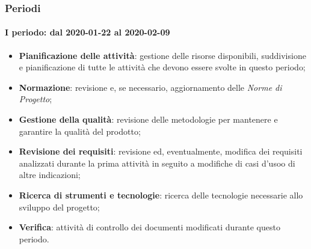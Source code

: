 \subsubsection{Periodi}
\paragraph*{I periodo: dal 2020-01-22 al 2020-02-09}
\begin{itemize}
	\item \textbf{Pianificazione delle attività}: gestione delle risorse disponibili, suddivisione e pianificazione di tutte le attività che devono essere svolte in questo periodo;
	\item \textbf{Normazione}: revisione e, se necessario, aggiornamento delle \textit{Norme di Progetto};
	\item \textbf{Gestione della qualità}: revisione delle metodologie per mantenere e garantire la qualità del prodotto\glo;
	\item \textbf{Revisione dei requisiti}: revisione ed, eventualmente, modifica dei requisiti analizzati durante la prima attività in seguito a modifiche di casi d'uso\glosp o di altre indicazioni;
	\item \textbf{Ricerca di strumenti e tecnologie}: ricerca delle tecnologie necessarie allo sviluppo del progetto\glo;
	\item \textbf{Verifica}: attività di controllo dei documenti modificati durante questo periodo.
\end{itemize}

